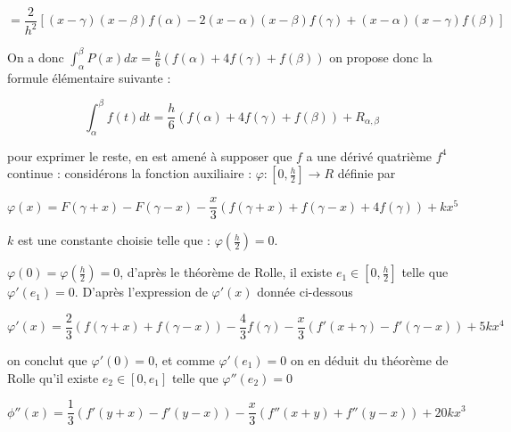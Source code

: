 \[
= \frac{2}{h^2}[(x-\gamma)(x-\beta)f(\alpha)-2(x-\alpha)(x-\beta)f(\gamma)+(x-\alpha)(x-\gamma)f(\beta)]
\]

On a donc \( \displaystyle\int_{\alpha}^{\beta} P(x)dx = \frac{h}{6}(f(\alpha)+4f(\gamma)+f(\beta)) \) on propose donc la formule élémentaire suivante :

\[
\displaystyle\int_{\alpha}^{\beta} f(t)dt = \frac{h}{6}(f(\alpha)+4f(\gamma)+f(\beta))+R_{\alpha,\beta}
\]

pour exprimer le reste, en est amené à supposer que \( f \) a une dérivé quatrième \( f^4 \) continue : considérons la fonction auxiliaire : \( \varphi : [0, \frac{h}{2}] \rightarrow R \) définie par

\[
\varphi(x) = F(\gamma+x)-F(\gamma-x) - \frac{x}{3}(f(\gamma+x)+f(\gamma-x)+4f(\gamma))+kx^5
\]

\( k \) est une constante choisie telle que : \( \varphi(\frac{h}{2}) = 0 \).

\( \varphi(0) = \varphi(\frac{h}{2}) = 0 \), d'après le théorème de Rolle, il existe \( e_1 \in [0, \frac{h}{2}] \) telle que \( \varphi'(e_1) = 0 \). D'après l'expression de \( \varphi'(x) \) donnée ci-dessous

\[
\varphi'(x) = \frac{2}{3}(f(\gamma+x)+f(\gamma-x)) - \frac{4}{3}f(\gamma) - \frac{x}{3}(f'(x+\gamma)-f'(\gamma-x))+5kx^4
\]

on conclut que \( \varphi'(0) = 0 \), et comme \( \varphi'(e_1) = 0 \) on en déduit du théorème de Rolle qu'il existe \( e_2 \in [0, e_1] \) telle que \( \varphi''(e_2) = 0 \)

\[
\phi''(x) = \frac{1}{3}(f'(y+x)-f'(y-x))-\frac{x}{3}(f''(x+y)+f''(y-x))+20kx^3
\]

